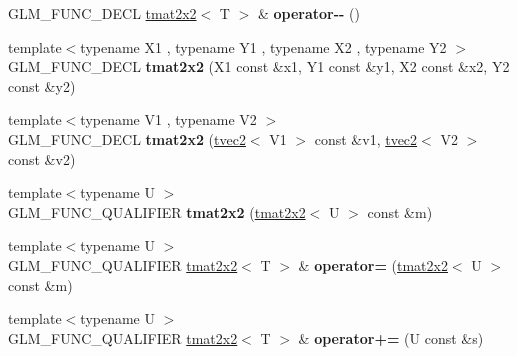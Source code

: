 \begin{DoxyCompactItemize}
\item 
\hypertarget{structglm_1_1detail_1_1tmat2x2_a31bbbcc16ab65eef93820ebce0cfed5f}{G\-L\-M\-\_\-\-F\-U\-N\-C\-\_\-\-D\-E\-C\-L \hyperlink{structglm_1_1detail_1_1tmat2x2}{tmat2x2}$<$ T $>$ \& {\bfseries operator-\/-\/} ()}\label{structglm_1_1detail_1_1tmat2x2_a31bbbcc16ab65eef93820ebce0cfed5f}

\item 
\hypertarget{structglm_1_1detail_1_1tmat2x2_a156ed12a043a58be23c0ca52a96f3ad6}{{\footnotesize template$<$typename X1 , typename Y1 , typename X2 , typename Y2 $>$ }\\G\-L\-M\-\_\-\-F\-U\-N\-C\-\_\-\-D\-E\-C\-L {\bfseries tmat2x2} (X1 const \&x1, Y1 const \&y1, X2 const \&x2, Y2 const \&y2)}\label{structglm_1_1detail_1_1tmat2x2_a156ed12a043a58be23c0ca52a96f3ad6}

\item 
\hypertarget{structglm_1_1detail_1_1tmat2x2_a5917090f191c8bd7ecbe81e369819e8a}{{\footnotesize template$<$typename V1 , typename V2 $>$ }\\G\-L\-M\-\_\-\-F\-U\-N\-C\-\_\-\-D\-E\-C\-L {\bfseries tmat2x2} (\hyperlink{structglm_1_1detail_1_1tvec2}{tvec2}$<$ V1 $>$ const \&v1, \hyperlink{structglm_1_1detail_1_1tvec2}{tvec2}$<$ V2 $>$ const \&v2)}\label{structglm_1_1detail_1_1tmat2x2_a5917090f191c8bd7ecbe81e369819e8a}

\item 
\hypertarget{structglm_1_1detail_1_1tmat2x2_a585d4b0bc985e4fa2f078000743972bb}{{\footnotesize template$<$typename U $>$ }\\G\-L\-M\-\_\-\-F\-U\-N\-C\-\_\-\-Q\-U\-A\-L\-I\-F\-I\-E\-R {\bfseries tmat2x2} (\hyperlink{structglm_1_1detail_1_1tmat2x2}{tmat2x2}$<$ U $>$ const \&m)}\label{structglm_1_1detail_1_1tmat2x2_a585d4b0bc985e4fa2f078000743972bb}

\item 
\hypertarget{structglm_1_1detail_1_1tmat2x2_a520a2abf2e623dcbfc6af9c1b4d41206}{{\footnotesize template$<$typename U $>$ }\\G\-L\-M\-\_\-\-F\-U\-N\-C\-\_\-\-Q\-U\-A\-L\-I\-F\-I\-E\-R \hyperlink{structglm_1_1detail_1_1tmat2x2}{tmat2x2}$<$ T $>$ \& {\bfseries operator=} (\hyperlink{structglm_1_1detail_1_1tmat2x2}{tmat2x2}$<$ U $>$ const \&m)}\label{structglm_1_1detail_1_1tmat2x2_a520a2abf2e623dcbfc6af9c1b4d41206}

\item 
\hypertarget{structglm_1_1detail_1_1tmat2x2_af03e41d83e503acff6fd07644c2aea26}{{\footnotesize template$<$typename U $>$ }\\G\-L\-M\-\_\-\-F\-U\-N\-C\-\_\-\-Q\-U\-A\-L\-I\-F\-I\-E\-R \hyperlink{structglm_1_1detail_1_1tmat2x2}{tmat2x2}$<$ T $>$ \& {\bfseries operator+=} (U const \&s)}\label{structglm_1_1detail_1_1tmat2x2_af03e41d83e503acff6fd07644c2aea26}


\end{DoxyCompactItemize}
